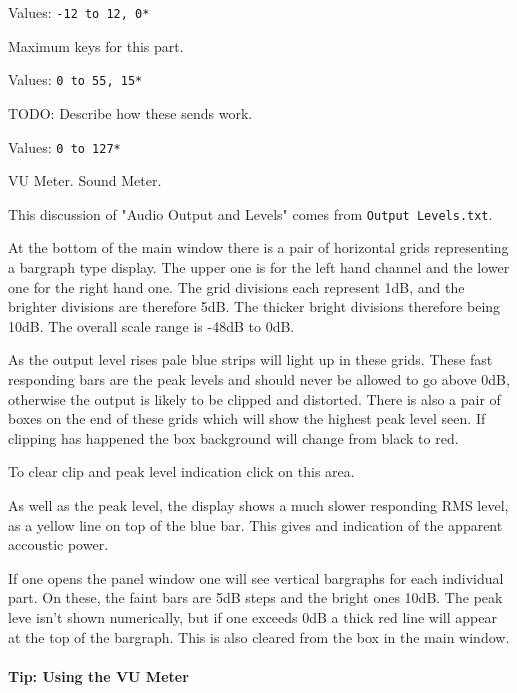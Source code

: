    Values: \texttt{-12 to 12, 0*}

   Maximum keys for this part.

   Values: \texttt{0 to 55, 15*}


   TODO:  Describe how these sends work.

   Values: \texttt{0 to 127*}

   VU Meter.  Sound Meter.

   This discussion of "Audio Output and Levels"
   comes from \texttt{Output Levels.txt}.

   At the bottom of the main window there is a pair of horizontal grids
   representing a bargraph type display. The upper one is for the left hand
   channel and the lower one for the right hand one. The grid divisions each
   represent 1dB, and the brighter divisions are therefore 5dB. The thicker
   bright divisions therefore being 10dB. The overall scale range is -48dB to
   0dB.

   As the output level rises pale blue strips will light up in these grids.
   These fast responding bars are the peak levels and should never be allowed
   to go above 0dB, otherwise the output is likely to be clipped and distorted.
   There is also a pair of boxes on the end of these grids which will show the
   highest peak level seen. If clipping has happened the box background will
   change from black to red.

   To clear clip and peak level indication click on this area.

   As well as the peak level, the display shows a much slower responding RMS
   level, as a yellow line on top of the blue bar. This gives and indication of
   the apparent accoustic power.

   If one opens the panel window one will see vertical bargraphs for each
   individual part. On these, the faint bars are 5dB steps and the bright ones
   10dB. The peak leve isn't shown numerically, but if one exceeds 0dB a thick
   red line will appear at the top of the bargraph. This is also cleared from
   the box in the main window.

\paragraph{Tip: Using the VU Meter}
\label{paragraph:tips_using_the_vu_meter}

